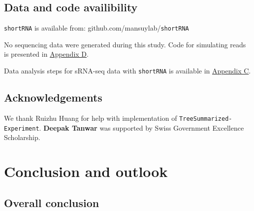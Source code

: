 \documentclass[12pt,twoside]{reedthesis}
\begin{document}
\hypertarget{data-and-code-availibility}{%
\section{Data and code availibility}\label{data-and-code-availibility}}

\texttt{shortRNA} is available from: github.com/mansuylab/\texttt{shortRNA}

No sequencing data were generated during this study. Code for simulating
reads is presented in \protect\hyperlink{ad}{Appendix D}.

Data analysis steps for sRNA-seq data with \texttt{shortRNA} is available in
\protect\hyperlink{ac}{Appendix C}.

\hypertarget{acknowledgements-2}{%
\section{Acknowledgements}\label{acknowledgements-2}}

We thank Ruizhu Huang for help with implementation of \texttt{TreeSummarized-} \texttt{Experiment}. \textbf{Deepak Tanwar} was supported by Swiss Government Excellence Scholarship.

\hypertarget{conclusion}{%
\chapter*{Conclusion and outlook}\label{conclusion}}

\hypertarget{overall-conclusion}{%
\section*{Overall conclusion}\label{overall-conclusion}}
\end{document}
